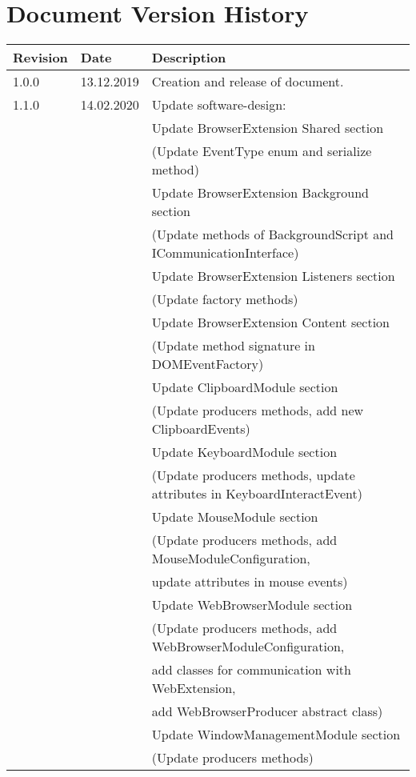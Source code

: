 \chapter*{Document Version History}
\label{ch:versionhistory}
\begin{table}[h]
\begin{tabular}{lll}
\textbf{Revision} & \textbf{Date} & \textbf{Description}              \\
\hline
1.0.0             & 13.12.2019    & Creation and release of document. \\
\hline
1.1.0			  & 14.02.2020	  & Update software-design: \\
&& Update BrowserExtension Shared section\\
&& (Update EventType enum and serialize method)\\
&& Update BrowserExtension Background section\\
&& (Update methods of BackgroundScript and ICommunicationInterface)\\
&& Update BrowserExtension Listeners section\\
&& (Update factory methods)\\
&& Update BrowserExtension Content section\\
&& (Update method signature in DOMEventFactory)\\
&& Update ClipboardModule section\\
&& (Update producers methods, add new ClipboardEvents)\\
&& Update KeyboardModule section\\
&& (Update producers methods, update attributes in KeyboardInteractEvent)\\
&& Update MouseModule section\\
&& (Update producers methods, add MouseModuleConfiguration,\\
&& update attributes in mouse events)\\
&& Update WebBrowserModule section\\
&& (Update producers methods, add WebBrowserModuleConfiguration,\\
&& add classes for communication with WebExtension,\\
&& add WebBrowserProducer abstract class)\\
&& Update WindowManagementModule section\\
&& (Update producers methods)\\

\end{tabular}
\end{table}